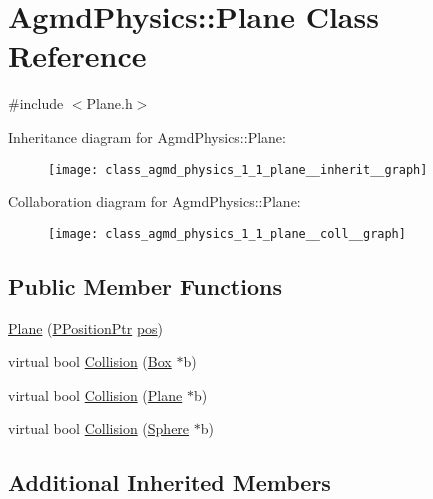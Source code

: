 \hypertarget{class_agmd_physics_1_1_plane}{\section{Agmd\+Physics\+:\+:Plane Class Reference}
\label{class_agmd_physics_1_1_plane}
}


{\ttfamily \#include $<$Plane.\+h$>$}



Inheritance diagram for Agmd\+Physics\+:\+:Plane\+:\nopagebreak
\begin{figure}[H]
\begin{center}
\leavevmode
\texttt{[image: class\_agmd\_physics\_1\_1\_plane\_\_inherit\_\_graph]}
\end{center}
\end{figure}


Collaboration diagram for Agmd\+Physics\+:\+:Plane\+:\nopagebreak
\begin{figure}[H]
\begin{center}
\leavevmode
\texttt{[image: class\_agmd\_physics\_1\_1\_plane\_\_coll\_\_graph]}
\end{center}
\end{figure}
\subsection*{Public Member Functions}
\begin{DoxyCompactItemize}
\item 
\hyperlink{class_agmd_physics_1_1_plane_a74c79e86bc867c5ed5a47bd99bccd4eb}{Plane} (\hyperlink{namespace_agmd_physics_a72f849383bbb96be02fec5a53333d7fd}{P\+Position\+Ptr} \hyperlink{_examples_2_planet_2_app_8cpp_aa8a1c0491559faca4ebd0881575ae7f0}{pos})
\item 
virtual bool \hyperlink{class_agmd_physics_1_1_plane_a0484a374ac81e2c04efbe3944f36fc03}{Collision} (\hyperlink{class_agmd_physics_1_1_box}{Box} $\ast$b)
\item 
virtual bool \hyperlink{class_agmd_physics_1_1_plane_ade89898466021d9f783a65fb16ccd7e3}{Collision} (\hyperlink{class_agmd_physics_1_1_plane}{Plane} $\ast$b)
\item 
virtual bool \hyperlink{class_agmd_physics_1_1_plane_a46c30eed7477c11366ba2b99d84b4256}{Collision} (\hyperlink{class_agmd_physics_1_1_sphere}{Sphere} $\ast$b)
\end{DoxyCompactItemize}
\subsection*{Additional Inherited Members}


